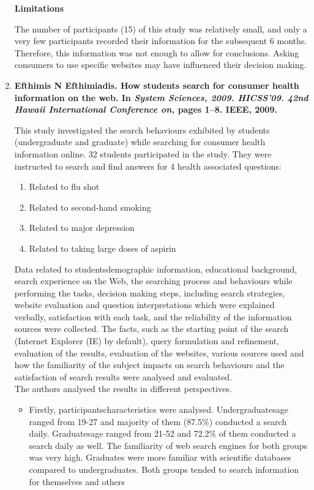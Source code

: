 \documentclass[]{article}
\begin{document}
\begin{enumerate}
\textbf{Limitations}

The number of participants (15) of this study was relatively small, and only a very few participants recorded their information for the subsequent 6 months. Therefore, this information was not enough to allow for conclusions.  Asking consumers to use specific websites may have influenced their decision making. \\


\item {\textbf{Efthimis N Efthimiadis. How students search for consumer health information on the web. In \textit{System Sciences, 2009. HICSS’09. 42nd Hawaii International Conference on,} pages 1–8. IEEE, 2009.}}

This study investigated the search behaviours exhibited by students (undergraduate and graduate) while searching for consumer health information online. 32 students participated in the study. They were instructed to search and find answers for 4 health associated questions: 

\begin{enumerate}
	\item Related to flu shot
	\item Related to second-hand smoking
	\item Related to major depression
	\item Related to taking large doses of aspirin    
\end{enumerate}

Data related to students\textquotesingle demographic information, educational background, search experience on the Web, the searching process and behaviours while performing the tasks, decision making steps, including search strategies, website evaluation and question interpretations which were explained verbally, satisfaction with each task, and the reliability of the information sources were collected. The facts, such as the starting point of the search (Internet Explorer (IE) by default), query formulation and refinement, evaluation of the results, evaluation of the websites, various sources used and how the familiarity of the subject impacts on search behaviours and the satisfaction of search results were analysed and evaluated.\\

The authors analysed the results in different perspectives.

\begin{itemize}
	\item Firstly, participants\textquotesingle  characteristics were analysed. Undergraduates\textquotesingle  age ranged from 19-27 and majority of them (87.5\%) conducted a search daily. Graduates\textquotesingle  age ranged from 21-52 and 72.2\% of them conducted a search daily as well. The familiarity of web search engines for both groups was very high. Graduates were more familiar with scientific databases compared to undergraduates. Both groups tended to search information for themselves and others
	

\end{itemize}
\end{enumerate}
\end{document}
